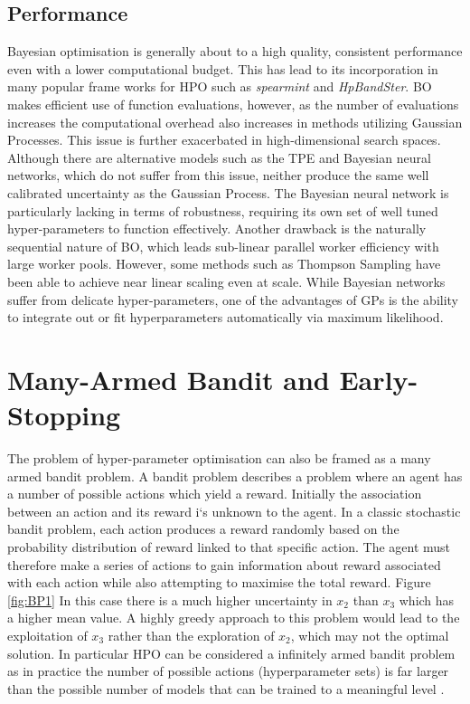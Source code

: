 \documentclass{article}
\begin{document}
	\subsection{Performance}

		Bayesian optimisation is generally about to a high quality, consistent performance even with a lower computational budget. This has lead to its incorporation in many popular frame works for HPO such as \textit{spearmint} and \textit{HpBandSter}. BO makes efficient use of function evaluations, however, as the number of evaluations increases the computational overhead also increases in methods utilizing Gaussian Processes. This issue is further exacerbated in high-dimensional search spaces. Although there are alternative models such as the TPE and Bayesian neural networks, which do not suffer from this issue, neither produce the same well calibrated uncertainty as the Gaussian Process. The Bayesian neural network is particularly lacking in terms of robustness, requiring its own set of well tuned hyper-parameters to function effectively. Another drawback is the naturally sequential nature of BO, which leads sub-linear parallel worker efficiency with large worker pools. However, some methods such as Thompson Sampling have been able to achieve near linear scaling even at scale. While Bayesian networks suffer from delicate hyper-parameters, one of the advantages of GPs is the ability to integrate out or fit hyperparameters automatically via maximum likelihood.
		

\newpage

\section {Many-Armed Bandit and Early-Stopping}\label{bandit}



	The problem of hyper-parameter optimisation can also be framed as a many armed bandit problem. A bandit problem describes a problem where an agent has a number of possible actions which yield a reward. Initially the association between an action and its reward i`s unknown to the agent. In a classic stochastic bandit problem, each action produces a reward randomly based on the probability distribution of reward linked to that specific action. The agent must therefore make a series of actions to gain information about reward associated with each action while also attempting to maximise the total reward. Figure \ref{fig:BP1} In this case there is a much higher uncertainty in \(x_2\) than \(x_3\) which has a higher mean value. A highly greedy approach to this problem would lead to the exploitation of \(x_3\) rather than the exploration of \(x_2\), which may not the optimal solution. In particular HPO can be considered a infinitely armed bandit problem as in practice the number of possible actions (hyperparameter sets) is far larger than the possible number of models that can be trained to a meaningful level \cite{infbandit}.
\end{document}
